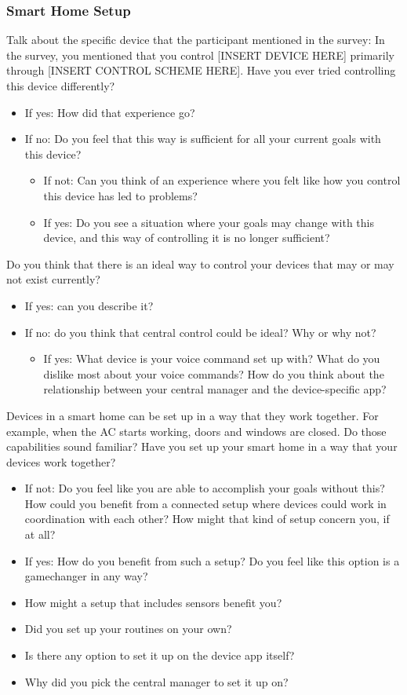 \subsubsection{Smart Home Setup}
Talk about the specific device that the participant mentioned in the survey:
In the survey, you mentioned that you control [INSERT DEVICE HERE] primarily through [INSERT CONTROL SCHEME HERE]. Have you ever tried controlling this device differently?
\begin{itemize}
    \item If yes: How did that experience go?
    \item If no: Do you feel that this way is sufficient for all your current goals with this device? 
        \begin{itemize}
            \item If not: Can you think of an experience where you felt like how you control this device has led to problems?
            \item If yes: Do you see a situation where your goals may change with this device, and this way of controlling it is no longer sufficient?
        \end{itemize}
\end{itemize}
Do you think that there is an ideal way to control your devices that may or may not exist currently?
\begin{itemize}
    \item If yes: can you describe it?
    \item If no: do you think that central control could be ideal? Why or why not?
        \begin{itemize}
            \item If yes: What device is your voice command set up with? What do you dislike most about your voice commands? How do you think about the relationship between your central manager and the device-specific app?
        \end{itemize}
\end{itemize}
Devices in a smart home can be set up in a way that they work together. For example, when the AC starts working, doors and windows are closed. Do those capabilities sound familiar?
Have you set up your smart home in a way that your devices work together?
\begin{itemize}
    \item If not: Do you feel like you are able to accomplish your goals without this? How could you benefit from a connected setup where devices could work in coordination with each other? How might that kind of setup concern you, if at all?
    \item If yes: How do you benefit from such a setup? Do you feel like this option is a gamechanger in any way?
    \item How might a setup that includes sensors benefit you?
    \item Did you set up your routines on your own?
    \item Is there any option to set it up on the device app itself?
    \item Why did you pick the central manager to set it up on?
\end{itemize}

